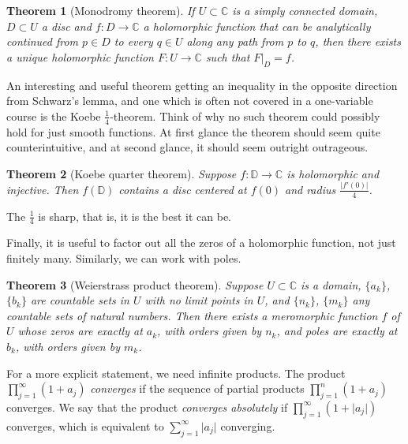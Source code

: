 \documentclass[12pt,openany]{book}
\newcommand{\sabs}[1]{\lvert {#1} \rvert}
\newcommand{\C}{{\mathbb{C}}}
\newcommand{\D}{{\mathbb{D}}}
\theoremstyle{plain}
\newtheorem{thm}{Theorem}[section]
\theoremstyle{remark}
\theoremstyle{definition}
\theoremstyle{exercise}
\theoremstyle{example}
\begin{document}
\begin{thm}[Monodromy theorem]
If $U \subset \C$ is a simply connected domain, $D \subset U$ a disc and
$f \colon D \to \C$ a holomorphic function that can be analytically
continued from $p \in D$ to every $q \in U$ along any path from $p$ to $q$, then there exists
a unique holomorphic function $F \colon U \to \C$ such that $F|_D = f$.
\end{thm}

\medskip

An interesting and useful theorem getting an inequality in the opposite
direction from
Schwarz's lemma, and one which is often not covered in a one-variable
course is the Koebe $\frac{1}{4}$-theorem.
Think of why no such theorem could possibly hold for just smooth
functions.  At first glance the theorem should seem quite counterintuitive,
and at second glance, it should seem outright outrageous.

\begin{thm}[Koebe quarter theorem]
Suppose $f \colon \D \to \C$ is holomorphic and injective.  Then
$f(\D)$ contains a disc centered at $f(0)$ and radius $\frac{\sabs{f'(0)}}{4}$.
\end{thm}

The $\frac{1}{4}$ is sharp, that is, it is the best it can be.

\medskip

Finally, it is useful to factor out all the zeros of a holomorphic function,
not just finitely many.  Similarly, we can work with poles.

\begin{thm}[Weierstrass product theorem]
Suppose $U \subset \C$ is a domain, $\{ a_k \}$, $\{ b_k \}$ are
countable sets in $U$
with no limit points in $U$, and $\{ n_k \}$, $\{ m_k \}$ any countable sets of
natural numbers.
Then there exists a meromorphic function $f$ of $U$ whose
zeros are exactly at $a_k$, with orders given by $n_k$, and
poles are exactly at $b_k$, with orders given by $m_k$.
\end{thm}

For a more explicit statement, we need infinite products.  The product
$\prod_{j=1}^\infty (1+a_j)$
\emph{converges} if the sequence of partial products
$\prod_{j=1}^n (1+a_j)$ converges.  We say that the product
\emph{converges absolutely} if
$\prod_{j=1}^\infty (1+\sabs{a_j})$
converges, which is equivalent to $\sum_{j=1}^\infty \sabs{a_j}$ converging.
\end{document}

